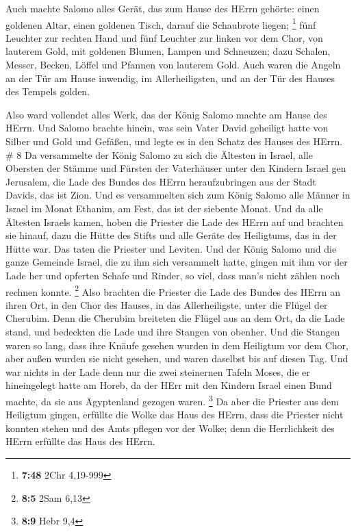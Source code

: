  Auch machte Salomo alles Gerät, das zum Hause des HErrn
gehörte: einen goldenen Altar, einen goldenen Tisch, darauf die
Schaubrote liegen; \footnote{\textbf{7:48} 2Chr 4,19-999} 
fünf Leuchter zur rechten Hand und fünf Leuchter zur linken vor dem
Chor, von lauterem Gold, mit goldenen Blumen, Lampen und Schneuzen;
 dazu Schalen, Messer, Becken, Löffel und Pfannen von
lauterem Gold. Auch waren die Angeln an der Tür am Hause inwendig, im
Allerheiligsten, und an der Tür des Hauses des Tempels golden.

 Also ward vollendet alles Werk, das der König Salomo
machte am Hause des HErrn. Und Salomo brachte hinein, was sein Vater
David geheiligt hatte von Silber und Gold und Gefäßen, und legte es in
den Schatz des Hauses des HErrn. \# 8  Da versammelte der
König Salomo zu sich die Ältesten in Israel, alle Obersten der Stämme
und Fürsten der Vaterhäuser unter den Kindern Israel gen Jerusalem, die
Lade des Bundes des HErrn heraufzubringen aus der Stadt Davids, das ist
Zion.  Und es versammelten sich zum König Salomo alle Männer
in Israel im Monat Ethanim, am Fest, das ist der siebente Monat.
 Und da alle Ältesten Israels kamen, hoben die Priester die
Lade des HErrn auf  und brachten sie hinauf, dazu die Hütte
des Stifts und alle Geräte des Heiligtums, das in der Hütte war. Das
taten die Priester und Leviten.  Und der König Salomo und
die ganze Gemeinde Israel, die zu ihm sich versammelt hatte, gingen mit
ihm vor der Lade her und opferten Schafe und Rinder, so viel, dass man's
nicht zählen noch rechnen konnte. \footnote{\textbf{8:5} 2Sam 6,13}
 Also brachten die Priester die Lade des Bundes des HErrn an
ihren Ort, in den Chor des Hauses, in das Allerheiligste, unter die
Flügel der Cherubim.  Denn die Cherubim breiteten die Flügel
aus an dem Ort, da die Lade stand, und bedeckten die Lade und ihre
Stangen von obenher.  Und die Stangen waren so lang, dass
ihre Knäufe gesehen wurden in dem Heiligtum vor dem Chor, aber außen
wurden sie nicht gesehen, und waren daselbst bis auf diesen Tag.
 Und war nichts in der Lade denn nur die zwei steinernen
Tafeln Moses, die er hineingelegt hatte am Horeb, da der HErr mit den
Kindern Israel einen Bund machte, da sie aus Ägyptenland gezogen waren.
\footnote{\textbf{8:9} Hebr 9,4}  Da aber die Priester aus
dem Heiligtum gingen, erfüllte die Wolke das Haus des HErrn,
 dass die Priester nicht konnten stehen und des Amts
pflegen vor der Wolke; denn die Herrlichkeit des HErrn erfüllte das Haus
des HErrn.

